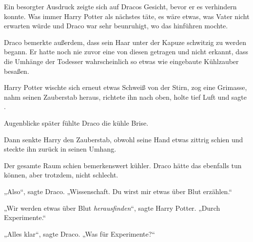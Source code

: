Ein besorgter Ausdruck zeigte sich auf Dracos Gesicht, bevor er es verhindern konnte. Was immer Harry Potter als nächstes täte, es wäre etwas, was Vater nicht erwarten würde und Draco war sehr beunruhigt, wo das hinführen mochte.

Draco bemerkte außerdem, dass sein Haar unter der Kapuze schwitzig zu werden begann. Er hatte noch nie zuvor eine von diesen getragen und nicht erkannt, dass die Umhänge der Todesser wahrscheinlich so etwas wie eingebaute Kühlzauber besaßen.

Harry Potter wischte sich erneut etwas Schweiß von der Stirn, zog eine Grimasse, nahm seinen Zauberstab heraus, richtete ihn nach oben, holte tief Luft und sagte .

Augenblicke später fühlte Draco die kühle Brise.


Dann senkte Harry den Zauberstab, obwohl seine Hand etwas zittrig schien und steckte ihn zurück in seinen Umhang.

Der gesamte Raum schien bemerkenswert kühler. Draco hätte das ebenfalls tun können, aber trotzdem, nicht schlecht.

„Also“, sagte Draco.
„Wissenschaft. Du wirst mir etwas über Blut erzählen.“

„Wir werden etwas über Blut \emph{herausfinden}“, sagte Harry Potter.
„Durch Experimente.“

„Alles klar“, sagte Draco.
„Was für Experimente?“

